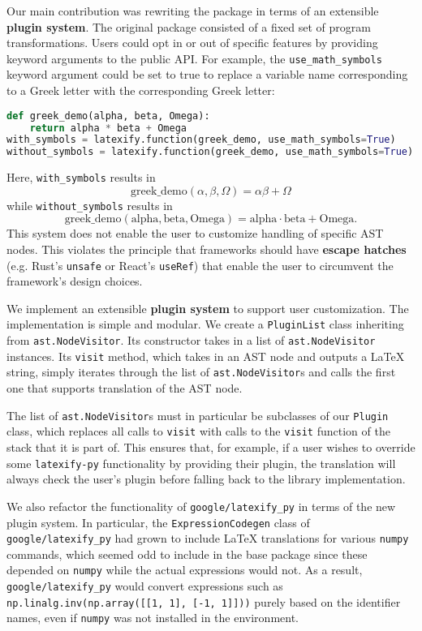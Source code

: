 \documentclass{article}
\newcommand{\ourpkg}{\texttt{latexify-py}}
\newcommand{\theirpkg}{\texttt{google/latexify\_py}}
\newcommand{\vocab}[1]{\textbf{#1}}
\begin{document}
Our main contribution was rewriting the package in terms of an extensible \vocab{plugin system}.
The original package consisted of a fixed set of program transformations.
Users could opt in or out of specific features by providing keyword arguments to the public API.
For example,
the \verb|use_math_symbols| keyword argument could be set to true
to replace a variable name corresponding to a Greek letter
with the corresponding Greek letter:
\begin{lstlisting}[language=Python]
def greek_demo(alpha, beta, Omega):
    return alpha * beta + Omega
with_symbols = latexify.function(greek_demo, use_math_symbols=True)
without_symbols = latexify.function(greek_demo, use_math_symbols=True)
\end{lstlisting}
Here, \verb|with_symbols| results in
\[
\displaystyle \mathrm{greek\_demo}(\alpha, \beta, \Omega) = \alpha \beta + \Omega
\]
while \verb|without_symbols| results in
\[
\displaystyle \mathrm{greek\_demo}(\mathrm{alpha}, \mathrm{beta}, \mathrm{Omega}) = \mathrm{alpha} \cdot \mathrm{beta} + \mathrm{Omega}.
\]
This system does not enable the user to customize handling of specific AST nodes.
This violates the principle that frameworks should have \vocab{escape hatches}
(e.g. Rust's \verb|unsafe| or React's \verb|useRef|)
that enable the user to circumvent the framework's design choices.

We implement an extensible \vocab{plugin system} to support user customization.
The implementation is simple and modular.
We create a \verb|PluginList| class inheriting from \verb|ast.NodeVisitor|.
Its constructor takes in a list of \verb|ast.NodeVisitor| instances.
Its \verb|visit| method,
which takes in an AST node and outputs a \LaTeX{} string,
simply iterates through the list of \verb|ast.NodeVisitor|s and calls the first one that supports translation of the AST node.

The list of \verb|ast.NodeVisitor|s must in particular be subclasses of our \verb|Plugin| class,
which replaces all calls to \verb|visit| with calls to the \verb|visit| function of the stack that it is part of.
This ensures that, for example,
if a user wishes to override some \ourpkg{} functionality by providing their plugin,
the translation will always check the user's plugin before falling back to the library implementation.

We also refactor the functionality of \theirpkg{} in terms of the new plugin system.
In particular, the \verb|ExpressionCodegen| class of \theirpkg{} had grown to include \LaTeX{} translations for various \verb|numpy| commands,
which seemed odd to include in the base package since these depended on \verb|numpy| while the actual expressions would not.
As a result, \theirpkg{} would convert expressions such as \verb|np.linalg.inv(np.array([[1, 1], [-1, 1]]))| purely based on the identifier names,
even if \verb|numpy| was not installed in the environment.
\end{document}
